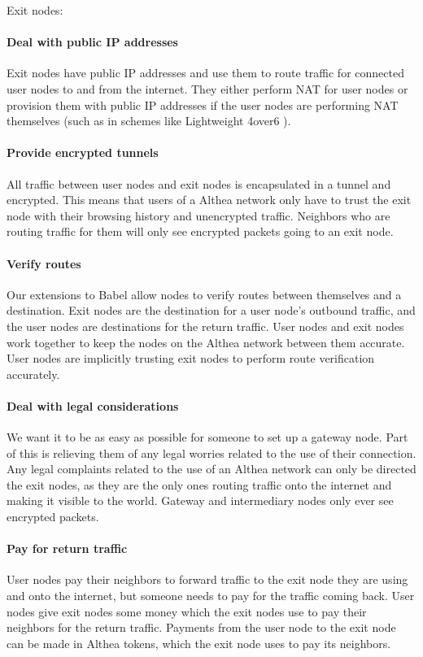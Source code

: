 \documentclass[11pt]{article}
\begin{document}
Exit nodes:

\paragraph{Deal with public IP addresses}
Exit nodes have public IP addresses and use them to route traffic for connected user nodes to and from the internet. They either perform NAT for user nodes or provision them with public IP addresses if the user nodes are performing NAT themselves (such as in schemes like Lightweight 4over6 \cite{4over6}). 

\paragraph{Provide encrypted tunnels}
All traffic between user nodes and exit nodes is encapsulated in a tunnel and encrypted. This means that users of a Althea network only have to trust the exit node with their browsing history and unencrypted traffic. Neighbors who are routing traffic for them will only see encrypted packets going to an exit node.

\paragraph{Verify routes}
Our extensions to Babel allow nodes to verify routes between themselves and a destination. Exit nodes are the destination for a user node’s outbound traffic, and the user nodes are destinations for the return traffic. User nodes and exit nodes work together to keep the nodes on the Althea network between them accurate. User nodes are implicitly trusting exit nodes to perform route verification accurately.

\paragraph{Deal with legal considerations}
We want it to be as easy as possible for someone to set up a gateway node. Part of this is relieving them of any legal worries related to the use of their connection. Any legal complaints related to the use of an Althea network can only be directed the exit nodes, as they are the only ones routing traffic onto the internet and making it visible to the world. Gateway and intermediary nodes only ever see encrypted packets.

\paragraph{Pay for return traffic}
User nodes pay their neighbors to forward traffic to the exit node they are using and onto the internet, but someone needs to pay for the traffic coming back. User nodes give exit nodes some money which the exit nodes use to pay their neighbors for the return traffic. Payments from the user node to the exit node can be made in Althea tokens, which the exit node uses to pay its neighbors.
\end{document}
